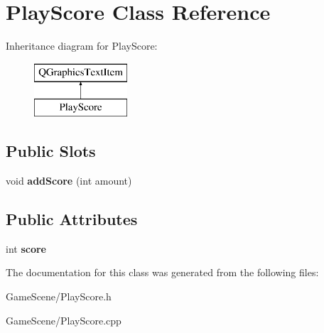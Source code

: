 \hypertarget{classPlayScore}{}\section{Play\+Score Class Reference}
\label{classPlayScore}
Inheritance diagram for Play\+Score\+:\begin{figure}[H]
\begin{center}
\leavevmode
\includegraphics[height=2.000000cm]{classPlayScore}
\end{center}
\end{figure}
\subsection*{Public Slots}
\begin{DoxyCompactItemize}
\item 
void {\bfseries add\+Score} (int amount)\hypertarget{classPlayScore_a9f72ef9c1592287a2a9ccab6e0692612}{}\label{classPlayScore_a9f72ef9c1592287a2a9ccab6e0692612}

\end{DoxyCompactItemize}
\subsection*{Public Attributes}
\begin{DoxyCompactItemize}
\item 
int {\bfseries score}\hypertarget{classPlayScore_a1f561d7ce7d52b44c72694489444ad8a}{}\label{classPlayScore_a1f561d7ce7d52b44c72694489444ad8a}

\end{DoxyCompactItemize}


The documentation for this class was generated from the following files\+:\begin{DoxyCompactItemize}
\item 
Game\+Scene/Play\+Score.\+h\item 
Game\+Scene/Play\+Score.\+cpp\end{DoxyCompactItemize}
